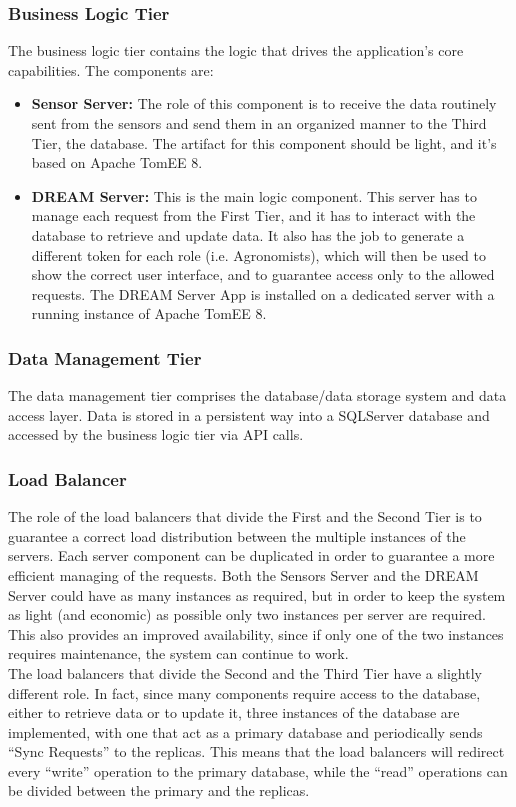 \subsubsection{Business Logic Tier}
The business logic tier contains the logic that drives the application’s core capabilities. The components are: 
\begin{itemize}
    \item \textbf{Sensor Server: }The role of this component is to receive the data routinely sent from the sensors and send them in an organized manner to the Third Tier, the database. The artifact for this component should be light, and it’s based on Apache TomEE 8.
    \item \textbf{DREAM Server: }This is the main logic component. This server has to manage each request from the First Tier, and it has to interact with the database to retrieve and update data. It also has the job to generate a different token for each role (i.e. Agronomists), which will then be used to show the correct user interface, and to guarantee access only to the allowed requests. The DREAM Server App is installed on a dedicated server with a running instance of Apache TomEE 8.
\end{itemize}

\subsubsection{Data Management Tier}
The data management tier comprises the database/data storage system and data access layer. Data is stored in a persistent way into a SQLServer database and accessed by the business logic tier via API calls.
\subsubsection{Load Balancer}
The role of the load balancers that divide the First and the Second Tier is to guarantee a correct load distribution between the multiple instances of the servers. Each server component can be duplicated in order to guarantee a more efficient managing of the requests. Both the Sensors Server and the DREAM Server could have as many instances as required, but in order to keep the system as light (and economic) as possible only two instances per server are required. This also provides an improved availability, since if only one of the two instances requires maintenance, the system can continue to work.\\
The load balancers that divide the Second and the Third Tier have a slightly different role. In fact, since many components require access to the database, either to retrieve data or to update it, three instances of the database are implemented, with one that act as a primary database and periodically sends “Sync Requests” to the replicas. This means that the load balancers will redirect every “write” operation to the primary database, while the “read” operations can be divided between the primary and the replicas.

